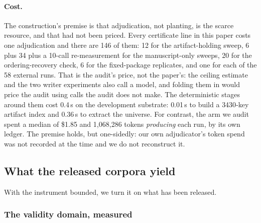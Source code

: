 \documentclass[10pt]{article}
\newcommand{\RM}[1]{{#1}}
\begin{document}
\paragraph{Cost.} The construction's premise is that adjudication, not
planting, is the scarce resource, and that had not been priced. Every
certificate line in this paper costs one adjudication and there are \RM{146} of
them: \RM{12} for the artifact-holding sweep, \RM{6} plus \RM{34} plus a
\RM{10}-call re-measurement for the manuscript-only sweeps, \RM{20} for the
ordering-recovery check, \RM{6} for the fixed-package replicates, and one for
each of the \RM{58} external runs. That is the audit's price, not the paper's:
the ceiling estimate and the two writer experiments also call a model, and
folding them in would price the audit using calls the audit does not make. The
deterministic stages around them cost
\RM{0.4}\,s on the development substrate: \RM{0.01}\,s to build a
\RM{3430}-key artifact index and \RM{0.36}\,s to extract the universe. For
contrast, the arm we audit spent a median of \$\RM{1.85} and
\RM{1{,}068{,}286} tokens \emph{producing} each run, by its own ledger. The
premise holds, but one-sidedly: our own adjudicator's token spend was not
recorded at the time and we do not reconstruct it.

\subsection{What the released corpora yield}
With the instrument bounded, we turn it on what has been released.

\subsubsection{The validity domain, measured}
\label{sec:firstarm}
\end{document}
